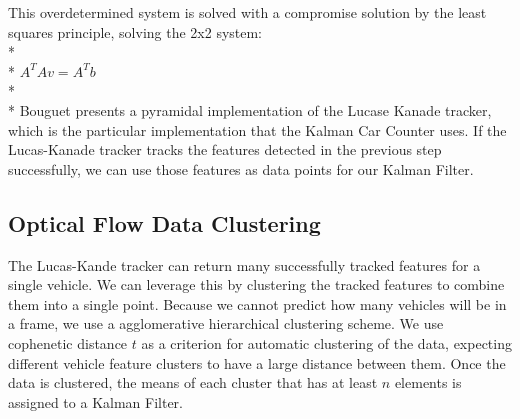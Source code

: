\documentclass[draft]{article} %
\begin{document}
This overdetermined system is solved with a compromise solution by the least squares principle, solving the 2x2 system:\\*\\*
$A^T A v=A^T b$\\*\\*
Bouguet presents a pyramidal implementation of the Lucase Kanade tracker\cite{bouguet2001pyramidal}, which is the particular implementation that the Kalman Car Counter uses. If the Lucas-Kanade tracker tracks the features detected in the previous step successfully, we can use those features as data points for our Kalman Filter.

\subsection{Optical Flow Data Clustering}
The Lucas-Kande tracker can return many successfully tracked features for a single vehicle. We can leverage this by clustering the tracked features to combine them into a single point. Because we cannot predict how many vehicles will be in a frame, we use a agglomerative hierarchical clustering scheme. We use cophenetic distance $t$ as a criterion for automatic clustering of the data, expecting different vehicle feature clusters to have a large distance between them. Once the data is clustered, the means of each cluster that has at least $n$ elements is assigned to a Kalman Filter.
\end{document}
